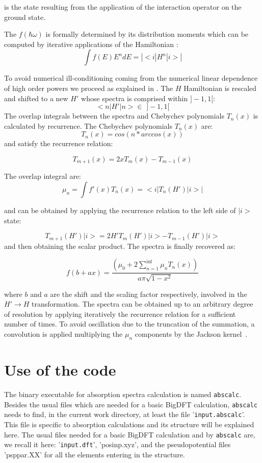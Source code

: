 \documentclass[a4paper,11pt]{report}
\begin{document}
is the state resulting from the application of the interaction operator on the ground state.

 The $f(\hbar \omega)$ is formally determined by its distribution moments
which can be computed by iterative applications of the Hamiltonian :
\begin{equation}
  \int  f(E) E^n d E = \left| < i | H^n| i > \right|
\end{equation}

To avoid numerical ill-conditioning coming from the numerical linear dependence of  high order powers we proceed as explained in \cite{weiss}.
 The $H$ Hamiltonian is rescaled  and shifted to a new $H'$ whose spectra
is comprised within $]-1,1[$:
$$   < n | H' | n > \in \,\, ]-1,1[ $$
The overlap integrals between the spectra and Chebychev polynomials $T_n(x)$ is calculated by recurrence.
The Chebychev polynomials $T_n(x)$ are:
$$  T_n(x) = cos( n * arccos(x)) $$
and satisfy the recurrence relation:

$$ T_{m+1}(x) = 2 x T_m(x) - T_{m-1} (x)$$

The overlap integral are:
$$\mu_n =  \int  f'(x) T_n(x) = < i |  T_n(H') | i > | $$

and can be obtained by applying the recurrence relation to the left side of $|i>$ state:

$$ T_{m+1}(H')| i > = 2 H' T_m(H')| i > - T_{m-1} (H')| i > $$
and then obtaining the scalar product. The spectra is finally recovered as:

$$  f( b+a x) = \frac{  (\mu_0+ 2 \sum_{n=1}^{\inf} \mu_n T_n(x)) }{a \pi \sqrt{1 - x^2} } $$

where $b$ and $a$ are the shift and the scaling factor respectively, involved in the $ H' \rightarrow H $ transformation.
The spectra can be obtained up to an arbitrary degree of resolution by
applying iteratively the recurrence relation for a sufficient number of times. To avoid oscillation
due to the truncation of the summation, a convolution is applied multiplying the $\mu_n$ 
components by the Jackson kernel~\cite{weiss}. 


\section{Use of the code}

The binary executable for absorption spectra calculation is named \texttt{abscalc}.
 Besides the usual files which  are needed for
a basic BigDFT calculation,  \texttt{abscalc} needs to find, 
 in the current  work directory, at least the file  '{\texttt{input.abscalc}}'. 
This file is specific to absorption calculations and 
its structure will be explained here.
The  usual files needed for a basic BigDFT calculation and by \texttt{abscalc} are, 
we recall it here: '{\texttt{input.dft}}', '{posinp.xyz}', and the pseudopotential files '{psppar.XX}' for
all the elements entering in the structure.
\end{document}

